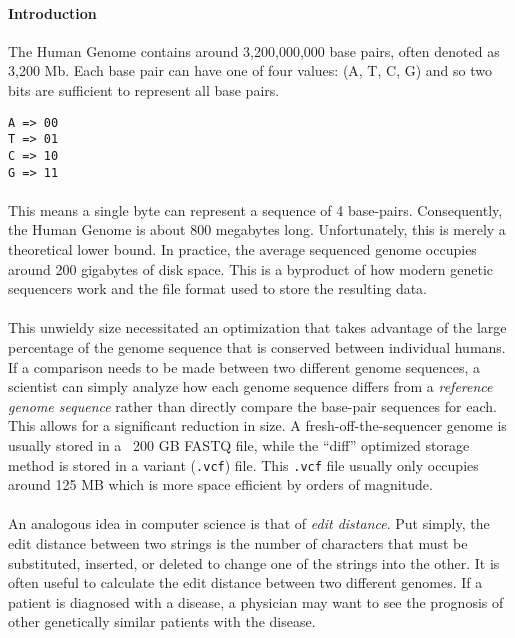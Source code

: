 \paragraph{Introduction}
The Human Genome contains around 3,200,000,000 base pairs, often denoted as 3,200 Mb.\cite{naturegene} Each base pair can have one of four values: (A, T, C, G) and so two bits are sufficient to represent all base pairs.

\begin{verbatim}
A => 00
T => 01
C => 10
G => 11
\end{verbatim}

\paragraph{}
This means a single byte can represent a sequence of 4 base-pairs. Consequently, the Human Genome is about 800 megabytes long. Unfortunately, this is merely a theoretical lower bound. In practice, the average sequenced genome occupies around 200 gigabytes of disk space. This is a byproduct of how modern genetic sequencers work and the file format used to store the resulting data.\cite{nihfaq}

\paragraph{}
This unwieldy size necessitated an optimization that takes advantage of the large percentage of the genome sequence that is conserved between individual humans. If a comparison needs to be made between two different genome sequences, a scientist can simply analyze how each genome sequence differs from a \textit{reference genome sequence} rather than directly compare the base-pair sequences for each. This allows for a significant reduction in size. A fresh-off-the-sequencer genome is usually stored in a ~200 GB FASTQ file, while the ``diff'' optimized storage method is stored in a variant (\texttt{.vcf}) file. This \texttt{.vcf} file usually only occupies around 125 MB which is more space efficient by orders of magnitude.\cite{vcf}

\paragraph{}
An analogous idea in computer science is that of \textit{edit distance}. Put simply, the edit distance between two strings is the number of characters that must be substituted, inserted, or deleted to change one of the strings into the other. It is often useful to calculate the edit distance between two different genomes. If a patient is diagnosed with a disease, a physician may want to see the prognosis of other genetically similar patients with the disease.

